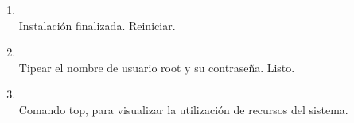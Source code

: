 \documentclass[11pt]{article}
\begin{document}
\begin{enumerate}
		    \item 
		    	\begin{minipage}[t]{\linewidth}
			        \raggedright
			        \medskip
			        \\Instalación finalizada. Reiniciar. 
		        \end{minipage}	

		   	\item 
		   		\begin{minipage}[t]{\linewidth}
			        \raggedright
			        \medskip
			        \\Tipear el nombre de usuario root y su contraseña. Listo. 
		        \end{minipage}	

		    \item 
		    	\begin{minipage}[t]{\linewidth}
			        \raggedright
			        \medskip
			        \\Comando top, para visualizar la utilización de recursos del sistema. 
		        \end{minipage}
		\end{enumerate}
\end{document}
